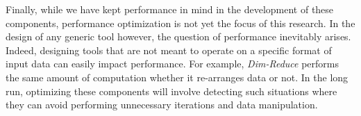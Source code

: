 Finally, while we have kept performance in mind in the development of these
components, performance optimization is not yet the focus of this research. In
the design of any generic tool however, the question of performance inevitably
arises. Indeed, designing tools that are not meant to operate on a specific
format of input data can easily impact performance. For example, {\em
Dim-Reduce} performs the same amount of computation whether it re-arranges data
or not. In the long run, optimizing these components will involve detecting
such situations where they can avoid performing unnecessary iterations and data
manipulation.
\fi
